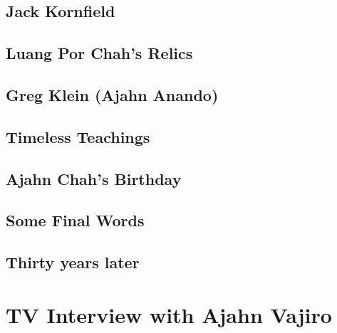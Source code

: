\documentclass[
  pagePreset=smallpage,
  babelLanguage=british,
]{aruno-anecdote}
\begin{document}
\chapter{Jack Kornfield}


\chapter{Luang Por Chah's Relics}


\chapter{Greg Klein (Ajahn Anando)}


\chapter{Timeless Teachings}


\chapter{Ajahn Chah's Birthday}


\chapter{Some Final Words}


\chapter{Thirty years later}


\part{TV Interview with Ajahn Vajiro}


%
\end{document}
